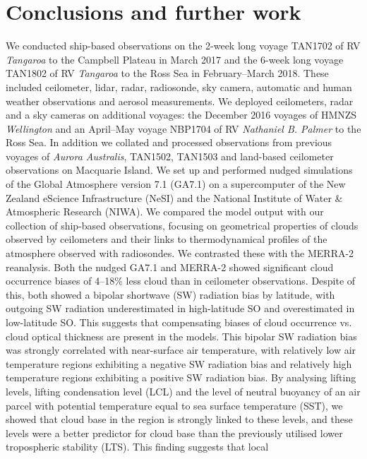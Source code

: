 \chapter{Conclusions and further work}

We conducted ship-based observations on the 2-week long voyage TAN1702 of
RV \textit{Tangaroa} to the Campbell Plateau
in March 2017 and the 6-week long voyage TAN1802 of RV \textit{Tangaroa} to the Ross Sea
in February--March 2018. These included ceilometer, lidar, radar, radiosonde,
sky camera, automatic and human weather observations and aerosol measurements.
We deployed ceilometers, radar and a sky cameras on additional voyages:
the December 2016 voyages of HMNZS \textit{Wellington} and an 
April--May voyage NBP1704 of RV \textit{Nathaniel B. Palmer} to the Ross Sea.
In addition we collated and processed observations from previous voyages
of \textit{Aurora Australis}, TAN1502, TAN1503 and land-based ceilometer
observations on Macquarie Island.
We set up and performed nudged simulations
of the Global Atmosphere version 7.1 (GA7.1) on a supercomputer of the New Zealand eScience Infrastructure (NeSI) and the National Institute of Water \& Atmospheric Research (NIWA).
We compared the model output with our collection of ship-based observations,
focusing on geometrical properties of clouds observed by ceilometers and their
links to thermodynamical profiles of the atmosphere observed with radiosondes.
We contrasted these with the MERRA-2 reanalysis. Both the nudged GA7.1 and MERRA-2
showed significant cloud occurrence biases of 4--18\% less cloud than in
ceilometer observations. Despite of this, both showed a bipolar shortwave (SW)
radiation
bias by latitude, with outgoing SW radiation underestimated in high-latitude
SO and overestimated in low-latitude SO. This suggests that compensating biases
of cloud occurrence vs. cloud optical thickness are present in the models.
This bipolar SW radiation bias was strongly correlated with near-surface air temperature,
with relatively low air temperature regions exhibiting a negative SW radiation bias and
relatively high temperature regions exhibiting a positive SW radiation bias. By analysing
lifting levels, lifting condensation level (LCL) and the level of neutral buoyancy
of an air parcel with potential temperature equal to sea surface temperature (SST),
we showed that cloud base in the region is strongly linked to these levels,
and these levels were a better predictor for cloud base than the previously
utilised lower tropospheric stability (LTS). This finding suggests that local
